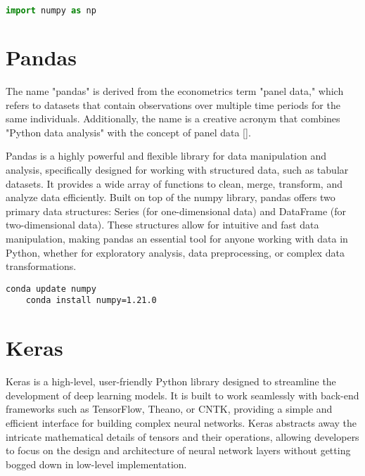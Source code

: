 \begin{lstlisting}[language=Python, caption={Example of importing NumPy}, label={code:import-numpy}, style=pythonstyle]
	import numpy as np
\end{lstlisting}

\section{Pandas}

The name "pandas" is derived from the econometrics term "panel data," which refers to datasets that contain observations over multiple time periods for the same individuals. Additionally, the name is a creative acronym that combines "Python data analysis" with the concept of panel data [\cite{McKinney:2012}]. 

Pandas is a highly powerful and flexible library for data manipulation and analysis, specifically designed for working with structured data, such as tabular datasets. It provides a wide array of functions to clean, merge, transform, and analyze data efficiently. Built on top of the numpy library, pandas offers two primary data structures: Series (for one-dimensional data) and DataFrame (for two-dimensional data). These structures allow for intuitive and fast data manipulation, making pandas an essential tool for anyone working with data in Python, whether for exploratory analysis, data preprocessing, or complex data transformations.

\begin{lstlisting}[caption={Commands to update or install a specific version of NumPy using conda}, label={code:conda-install-numpy}, style=pythonstyle]
	conda update numpy
	conda install numpy=1.21.0
\end{lstlisting}

\section{Keras}  

Keras is a high-level, user-friendly Python library designed to streamline the development of deep learning models. It is built to work seamlessly with back-end frameworks such as TensorFlow, Theano, or CNTK, providing a simple and efficient interface for building complex neural networks. Keras abstracts away the intricate mathematical details of tensors and their operations, allowing developers to focus on the design and architecture of neural network layers without getting bogged down in low-level implementation.

